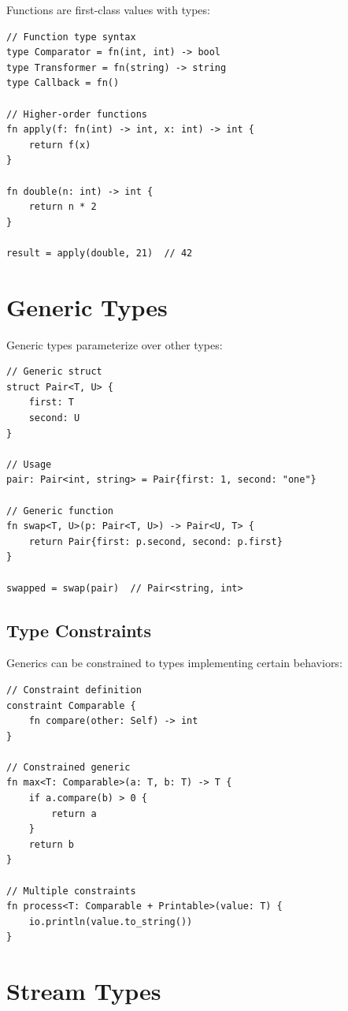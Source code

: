 Functions are first-class values with types:

\begin{lstlisting}
// Function type syntax
type Comparator = fn(int, int) -> bool
type Transformer = fn(string) -> string
type Callback = fn()

// Higher-order functions
fn apply(f: fn(int) -> int, x: int) -> int {
    return f(x)
}

fn double(n: int) -> int {
    return n * 2
}

result = apply(double, 21)  // 42
\end{lstlisting}

\section{Generic Types}

Generic types parameterize over other types:

\begin{lstlisting}
// Generic struct
struct Pair<T, U> {
    first: T
    second: U
}

// Usage
pair: Pair<int, string> = Pair{first: 1, second: "one"}

// Generic function
fn swap<T, U>(p: Pair<T, U>) -> Pair<U, T> {
    return Pair{first: p.second, second: p.first}
}

swapped = swap(pair)  // Pair<string, int>
\end{lstlisting}

\subsection{Type Constraints}

Generics can be constrained to types implementing certain behaviors:

\begin{lstlisting}
// Constraint definition
constraint Comparable {
    fn compare(other: Self) -> int
}

// Constrained generic
fn max<T: Comparable>(a: T, b: T) -> T {
    if a.compare(b) > 0 {
        return a
    }
    return b
}

// Multiple constraints
fn process<T: Comparable + Printable>(value: T) {
    io.println(value.to_string())
}
\end{lstlisting}

\section{Stream Types}

